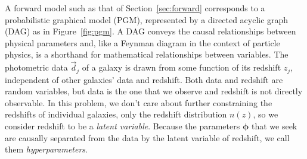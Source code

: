 \documentclass[iop]{emulateapj}
\newcommand{\Sect}[1]{Section~\ref{#1}}
\newcommand{\Fig}[1]{Figure~\ref{#1}}
\newcommand{\data}{\ensuremath{\vec{d}}}
\newcommand{\nz}{$n(z)$}
\newcommand{\bvec}[1]{\ensuremath{\boldsymbol{#1}}}
\newcommand{\ndphi}{\bvec{\phi}}
\begin{document}
A forward model such as that of \Sect{sec:forward} corresponds to a probabilistic graphical model (PGM), represented by a directed acyclic graph (DAG) as in \Fig{fig:pgm}.
A DAG conveys the causal relationships between physical parameters and, like a Feynman diagram in the context of particle physics, is a shorthand for mathematical relationships between variables.
The photometric data $\data_{j}$ of a galaxy is drawn from some function of its redshift $z_{j}$, independent of other galaxies' data and redshift.
Both data and redshift are random variables, but data is the one that we observe and redshift is not directly observable.
In this problem, we don't care about further constraining the redshifts of individual galaxies, only the redshift distribution \nz, so we consider redshift to be a \textit{latent variable}.
Because the parameters $\ndphi$ that we seek are causally separated from the data by the latent variable of redshift, we call them \textit{hyperparameters}.
\end{document}

